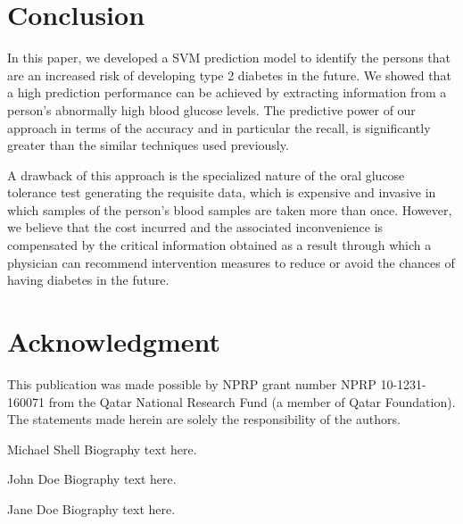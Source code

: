 \documentclass[journal,comsoc]{IEEEtran}
\renewcommand{\^}{\hat}  %
\begin{document}
\section{Conclusion}
%
%
In this paper, we developed a SVM prediction model to identify the persons that are an increased risk of developing type 2 diabetes in the future. We showed that a high prediction performance can be achieved by extracting information from a person's abnormally high blood glucose levels. The predictive power of our approach in terms of the accuracy and in particular the recall, is significantly greater than the similar techniques used previously.

A drawback of this approach is the specialized nature of the oral glucose tolerance test generating the requisite data, which is expensive and invasive in which samples of the person's blood samples are taken more than once. However, we believe that the cost incurred and the associated inconvenience is compensated by the critical information obtained as a result through which a physician can recommend intervention measures to reduce or avoid the chances of having diabetes in the future.
%
%
%
%
\section*{Acknowledgment}
%
This publication was made possible by NPRP grant number NPRP 10-1231-160071 from the Qatar National Research Fund (a member of Qatar Foundation). The statements made herein are solely the responsibility of the authors.
%
%
\ifCLASSOPTIONcaptionsoff
\newpage
\fi

% 

%
%
\begin{IEEEbiography}{Michael Shell}
  Biography text here.
\end{IEEEbiography}
%
\begin{IEEEbiographynophoto}{John Doe}
  Biography text here.
\end{IEEEbiographynophoto}
%
%
\begin{IEEEbiographynophoto}{Jane Doe}
  Biography text here.
\end{IEEEbiographynophoto}
%





\end{document}

